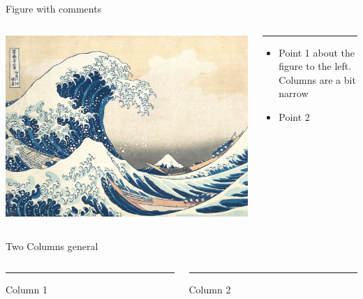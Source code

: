 \documentclass[aspectratio=43]{beamer}
\begin{document}
\begin{frame}{Figure with comments}
    \begin{columns}[T] %
    \begin{column}{.62\textwidth}
        \includegraphics[width= \linewidth]{img/kanagawa.jpg}
    \end{column}%

    \begin{column}{.38\textwidth}
        {\color{buff-gold}\rule{\linewidth}{4pt}}
        
        \begin{itemize}[leftmargin=0cm]
            \item Point 1 about the figure to the left. Columns are a bit narrow
            \item Point 2
        \end{itemize}
    \end{column}%
    \end{columns}
\end{frame}


\begin{frame}{Two Columns general}
    \begin{columns}[T] %
    \begin{column}{.50\textwidth}
        {\color{buff-gold}\rule{\linewidth}{4pt}}
        Column 1
    \end{column}
    
    \hfill
    
    \begin{column}{.50\textwidth}
        {\color{buff-gold}\rule{\linewidth}{4pt}}
        Column 2
    \end{column}
    \end{columns}
\end{frame}
\end{document}
